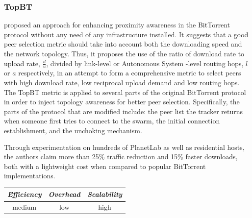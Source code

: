 \subsubsection{TopBT}
\cite{RTLCGZ2010} proposed an approach for enhancing proximity awareness
in the BitTorrent protocol without any need of any infrastructure installed. It
suggests that a good peer selection metric should take into account both the
downloading speed and the network topology. Thus, it proposes the use of the
ratio of download rate to upload rate, $\frac{d}{u}$, divided by link-level or
Autonomous System -level routing hops, $l$ or $a$ respectively, in an attempt to
form a comprehensive metric to select peers with high download rate, low
reciprocal upload demand and low routing hops. The TopBT metric is applied to
several parts of the original BitTorrent protocol in order to inject topology
awareness for better peer selection. Specifically, the parts of the protocol
that are modified include:  the peer list the
tracker returns when someone first tries to connect to the swarm, the initial
connection establishment, and the
unchoking mechanism.


Through experimentation on hundreds of PlanetLab as well as residential hosts,
the authors claim more than 25\% traffic reduction and 15\% faster downloads,
both with a lightweight cost when compared to popular BitTorrent
implementations.

\begin{center}
\begin{tabular}{ccc}
\emph{Efficiency} & \emph{Overhead} & \emph{Scalability} \\
\hline
medium &
low &
high
\end{tabular}
\end{center}

